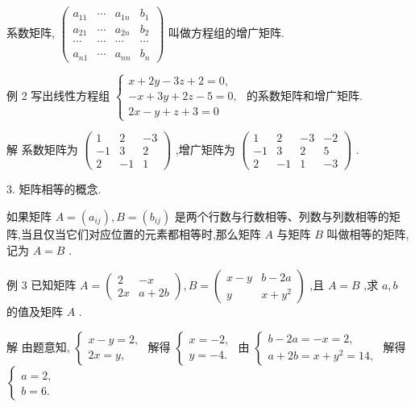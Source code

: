 \documentclass[10pt]{article}
\begin{document}
系数矩阵, \(\left( \begin{array}{llll} {a}_{11} & \cdots & {a}_{1n} & {b}_{1} \\  {a}_{21} & \cdots & {a}_{2n} & {b}_{2} \\  \cdots & \cdots & \cdots & \cdots \\  {a}_{n1} & \cdots & {a}_{nn} & {b}_{n} \end{array}\right)\) 叫做方程组的增广矩阵.

例 2 写出线性方程组 \(\left\{  \begin{array}{l} x + {2y} - {3z} + 2 = 0, \\   - x + {3y} + {2z} - 5 = 0, \\  {2x} - y + z + 3 = 0 \end{array}\right.\) 的系数矩阵和增广矩阵.

解 系数矩阵为 \(\left( \begin{matrix} 1 & 2 &  - 3 \\   - 1 & 3 & 2 \\  2 &  - 1 & 1 \end{matrix}\right)\) ,增广矩阵为 \(\left( \begin{matrix} 1 & 2 &  - 3 &  - 2 \\   - 1 & 3 & 2 & 5 \\  2 &  - 1 & 1 &  - 3 \end{matrix}\right)\) .

3. 矩阵相等的概念.

如果矩阵 \(A = \left( {a}_{ij}\right) ,B = \left( {b}_{ij}\right)\) 是两个行数与行数相等、列数与列数相等的矩阵,当且仅当它们对应位置的元素都相等时,那么矩阵 \(A\) 与矩阵 \(B\) 叫做相等的矩阵,记为 \(A = B\) .

例 3 已知矩阵 \(A = \left( \begin{matrix} 2 &  - x \\  {2x} & a + {2b} \end{matrix}\right) ,B = \left( \begin{matrix} x - y & b - {2a} \\  y & x + {y}^{2} \end{matrix}\right)\) ,且 \(A = B\) ,求 \(a,b\) 的值及矩阵 \(A\) .

解 由题意知, \(\left\{  \begin{array}{l} x - y = 2, \\  {2x} = y, \end{array}\right.\) 解得 \(\left\{  \begin{array}{l} x =  - 2, \\  y =  - 4. \end{array}\right.\) 由 \(\left\{  \begin{array}{l} b - {2a} =  - x = 2, \\  a + {2b} = x + {y}^{2} = {14}, \end{array}\right.\) 解得 \(\left\{  \begin{array}{l} a = 2, \\  b = 6. \end{array}\right.\)
\end{document}
